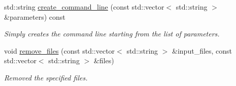 \begin{DoxyCompactItemize}
std\+::string \hyperlink{classToolManager_aafcbbb6648d720ac19b5201626f1315a}{create\+\_\+command\+\_\+line} (const std\+::vector$<$ std\+::string $>$ \&parameters) const
\begin{DoxyCompactList}\small\item\em Simply creates the command line starting from the list of parameters. \end{DoxyCompactList}\item 
void \hyperlink{classToolManager_a9fa29cf550d563627666c294e8a38855}{remove\+\_\+files} (const std\+::vector$<$ std\+::string $>$ \&input\+\_\+files, const std\+::vector$<$ std\+::string $>$ \&files)
\begin{DoxyCompactList}\small\item\em Removed the specified files. \end{DoxyCompactList}\end{DoxyCompactItemize}
